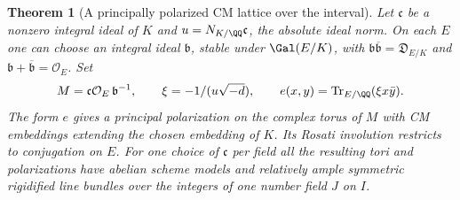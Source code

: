 \documentclass[a4paper,11pt]{article}
\newtheorem{theorem}[proposition]{Theorem}
\theoremstyle{definition}
\theoremstyle{remark}
\numberwithin{equation}{section}
\newcommand{\OO}{\mathcal O}
\begin{document}
\begin{theorem}[A principally polarized CM lattice over the interval]\label{thm:pol49}
Let \(\mathfrak c\) be a nonzero integral ideal of \(K\) and
\(u=N_{K/\QQ}\mathfrak c\), the absolute ideal norm. On each \(E\)
one can choose an integral ideal \(\mathfrak b\), stable under
\(\Gal(E/K)\), with
\(\mathfrak b\overline{\mathfrak b}=\mathfrak D_{E/K}\) and
\(\mathfrak b+\overline{\mathfrak b}=\OO_E\). Set
\[
 M=\mathfrak c\OO_E\,\mathfrak b^{-1},\qquad
 \xi=-1/(u\sqrt{-d}),\qquad
 e(x,y)=\operatorname{Tr}_{E/\QQ}(\xi x\bar y).
\]
The form \(e\) gives a principal polarization on the complex torus
of \(M\) with CM embeddings extending the chosen embedding of \(K\).
Its Rosati involution restricts to conjugation on \(E\).
For one choice of \(\mathfrak c\) per field all the resulting tori
and polarizations have abelian scheme models and relatively ample
symmetric rigidified line bundles over the integers of one number
field \(J\) on \(I\).
\end{theorem}
\end{document}
